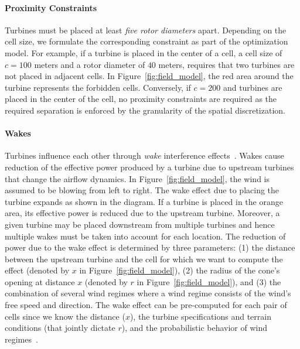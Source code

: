 \documentclass[preprint,12pt]{elsarticle}
\begin{document}
\paragraph{Proximity Constraints}
Turbines must be placed at least \emph{five rotor diameters}
apart. Depending on the cell size, we formulate the
corresponding constraint as part of the optimization model. For
example, if a turbine is placed in the center of a
cell, a cell size of $c = 100$ meters and a rotor diameter
of $40$ meters, requires that two turbines are not placed in adjacent cells. In Figure~\ref{fig:field_model}, the red area
around the turbine represents the forbidden cells. Conversely, if $c = 200$ and turbines are placed in the center of the cell, no proximity constraints are required as the required separation is enforced by the granularity of the spatial discretization.
	 
\paragraph{Wakes}
Turbines influence each other through \emph{wake} interference effects~\cite{jensen1983note,shakoor2016wake}.
Wakes cause reduction of the effective power produced by a turbine due
to upstream turbines that change the airflow dynamics. In
Figure~\ref{fig:field_model}, the wind is assumed to be
blowing from left to right. The wake effect due to placing the turbine
expands as shown in the diagram.
If a turbine is placed in the orange area, its effective power is
reduced due to the upstream turbine.
Moreover, a given turbine may be placed downstream from multiple turbines and hence
multiple wakes must be taken into account for each location.  The
reduction of power due to the wake effect is determined by three
parameters: (1) the distance between the upstream turbine and the cell
for which we want to compute the effect (denoted by $x$ in
Figure~\ref{fig:field_model}), (2) the radius of the cone's opening at distance $x$ 
(denoted by $r$ in Figure~\ref{fig:field_model}), and (3) the
combination of several wind regimes where a wind regime consists of 
the wind's free speed and direction.  The wake effect can be pre-computed
for each pair of cells since we know the distance ($x$), the turbine
specifications and terrain conditions (that jointly dictate $r$), and the
probabilistic behavior of wind regimes~\cite{Zhang2014}.
	 
\end{document}
